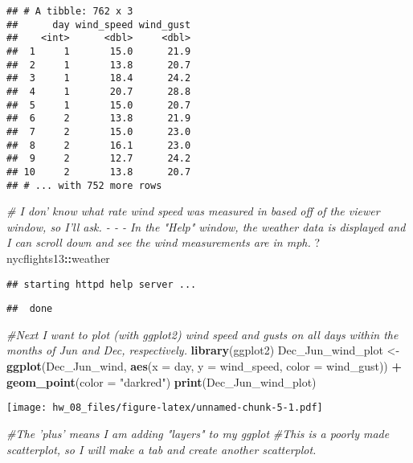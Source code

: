 \documentclass[
]{article}
\newenvironment{Shaded}{\begin{snugshade}}{\end{snugshade}}
\newcommand{\CommentTok}[1]{\textcolor[rgb]{0.56,0.35,0.01}{\textit{#1}}}
\newcommand{\DataTypeTok}[1]{\textcolor[rgb]{0.13,0.29,0.53}{#1}}
\newcommand{\KeywordTok}[1]{\textcolor[rgb]{0.13,0.29,0.53}{\textbf{#1}}}
\newcommand{\NormalTok}[1]{#1}
\newcommand{\OperatorTok}[1]{\textcolor[rgb]{0.81,0.36,0.00}{\textbf{#1}}}
\newcommand{\StringTok}[1]{\textcolor[rgb]{0.31,0.60,0.02}{#1}}
\begin{document}
\begin{verbatim}
## # A tibble: 762 x 3
##      day wind_speed wind_gust
##    <int>      <dbl>     <dbl>
##  1     1       15.0      21.9
##  2     1       13.8      20.7
##  3     1       18.4      24.2
##  4     1       20.7      28.8
##  5     1       15.0      20.7
##  6     2       13.8      21.9
##  7     2       15.0      23.0
##  8     2       16.1      23.0
##  9     2       12.7      24.2
## 10     2       13.8      20.7
## # ... with 752 more rows
\end{verbatim}

\begin{Shaded}
\begin{Highlighting}[]
\CommentTok{# I don' know what rate wind speed was measured in based off of the viewer window, so I'll ask.  - - - In the "Help" window, the weather data is displayed and I can scroll down and see the wind measurements are in mph.}
\NormalTok{?nycflights13}\OperatorTok{::}\NormalTok{weather}
\end{Highlighting}
\end{Shaded}

\begin{verbatim}
## starting httpd help server ...
\end{verbatim}

\begin{verbatim}
##  done
\end{verbatim}

\begin{Shaded}
\begin{Highlighting}[]
\CommentTok{#Next I want to plot (with ggplot2) wind speed and gusts on all days within the months of Jun and Dec, respectively. }
\KeywordTok{library}\NormalTok{(ggplot2)}
\NormalTok{Dec_Jun_wind_plot <-}\StringTok{ }\KeywordTok{ggplot}\NormalTok{(Dec_Jun_wind, }\KeywordTok{aes}\NormalTok{(}\DataTypeTok{x =}\NormalTok{ day, }
                         \DataTypeTok{y =}\NormalTok{ wind_speed, }
                         \DataTypeTok{color =}\NormalTok{ wind_gust)) }\OperatorTok{+}\StringTok{ }
\StringTok{  }\KeywordTok{geom_point}\NormalTok{(}\DataTypeTok{color =} \StringTok{"darkred"}\NormalTok{)}
\KeywordTok{print}\NormalTok{(Dec_Jun_wind_plot)}
\end{Highlighting}
\end{Shaded}

\texttt{[image: hw\_08\_files/figure-latex/unnamed-chunk-5-1.pdf]}

\begin{Shaded}
\begin{Highlighting}[]
\CommentTok{#The 'plus' means I am adding "layers" to my ggplot}
\CommentTok{#This is a poorly made scatterplot, so I will make a tab and create another scatterplot. }
\end{Highlighting}
\end{Shaded}
\end{document}
